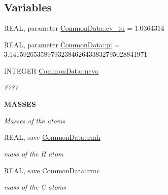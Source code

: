 \subsection*{Variables}
\begin{DoxyCompactItemize}
\item 
REAL, parameter \hyperlink{namespace_common_data_a425e3890d3344a540420425e443dc800}{CommonData::ev\_\-tu} = 1.0364314
\item 
REAL, parameter \hyperlink{namespace_common_data_a565ffab49e04f2d30ebed2b70485cbb2}{CommonData::pi} = 3.1415926535897932384626433832795028841971
\item 
INTEGER \hyperlink{namespace_common_data_a976b903826d3d0278c77a43ee3d29754}{CommonData::nevo}
\begin{DoxyCompactList}\small\item\em ???? \item\end{DoxyCompactList}\end{DoxyCompactItemize}
\begin{Indent}{\bf MASSES}\par
{\em \label{_amgrpc6c04a786e5ad5cf1e19a4894db38501}
Masses of the atoms }\begin{DoxyCompactItemize}
\item 
REAL, save \hyperlink{namespace_common_data_ab83fa563208d5b60c511fb8561b4cf02}{CommonData::rmh}
\begin{DoxyCompactList}\small\item\em mass of the H atom \item\end{DoxyCompactList}\item 
REAL, save \hyperlink{namespace_common_data_a5d2cb89262577c7e0271959b185d97f8}{CommonData::rmc}
\begin{DoxyCompactList}\small\item\em mass of the C atoms \item\end{DoxyCompactList}\end{DoxyCompactItemize}
\end{Indent}
